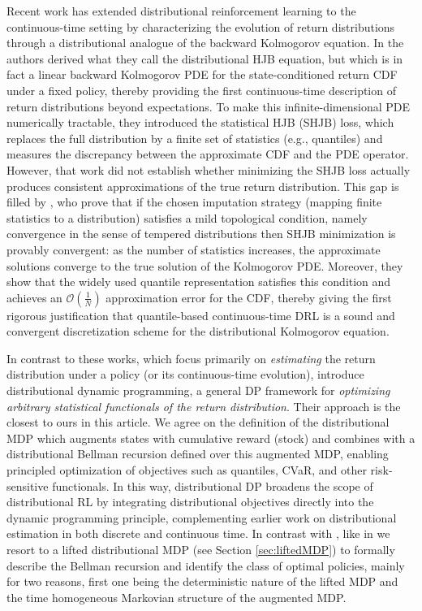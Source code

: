 \documentclass[reqno, 11pt]{amsart}%
\theoremstyle{definition}
\begin{document}
Recent work has extended distributional reinforcement learning to the continuous-time setting by characterizing the evolution of return distributions through a distributional analogue of the backward Kolmogorov equation. In \cite{wiltzer2022distributional} the authors derived what they call the distributional HJB equation, but which is in fact a linear backward Kolmogorov PDE for the state-conditioned return CDF under a fixed policy, thereby providing the first continuous-time description of return distributions beyond expectations. To make this infinite-dimensional PDE numerically tractable, they introduced the statistical HJB (SHJB) loss, which replaces the full distribution by a finite set of statistics (e.g., quantiles) and measures the discrepancy between the approximate CDF and the PDE operator. However, that work did not establish whether minimizing the SHJB loss actually produces consistent approximations of the true return distribution. This gap is filled by \cite{alhosh2025tractablerepresentationsconvergentapproximation}, who prove that if the chosen imputation strategy (mapping finite statistics to a distribution) satisfies a mild topological condition, namely convergence in the sense of tempered distributions then SHJB minimization is provably convergent: as the number of statistics increases, the approximate solutions converge to the true solution of the Kolmogorov PDE. Moreover, they show that the widely used quantile representation satisfies this condition and achieves an $\mathcal{O}(\frac{1}{N})$ approximation error for the CDF, thereby giving the first rigorous justification that quantile-based continuous-time DRL is a sound and convergent discretization scheme for the distributional Kolmogorov equation. 

In contrast to these works, which focus primarily on \emph{estimating} the return distribution under a policy (or its continuous-time evolution), \cite{bauerle2025distributionalbellmanequation,pires2025optimizing}  introduce distributional dynamic programming, a general DP framework for \emph{optimizing arbitrary statistical functionals of the 
return distribution}. Their approach is the closest to ours in this article. We agree on the definition of the distributional MDP which augments states with cumulative reward (stock) and combines with a distributional Bellman recursion defined over this augmented MDP, enabling principled optimization of objectives such as 
quantiles, CVaR, and other risk-sensitive functionals. In this way, distributional DP broadens the scope of distributional RL by integrating distributional objectives directly into the dynamic programming principle, complementing earlier work on distributional estimation in both discrete and continuous time. In contrast with \cite{pires2025optimizing}, like in \cite{bauerle2025distributionalbellmanequation} we resort to a lifted distributional MDP (see Section \ref{sec:liftedMDP})  to formally describe the Bellman recursion and identify the class of optimal policies, mainly for two reasons, first one being the deterministic nature of the lifted MDP and the time homogeneous Markovian structure of the augmented MDP.  
\end{document}
